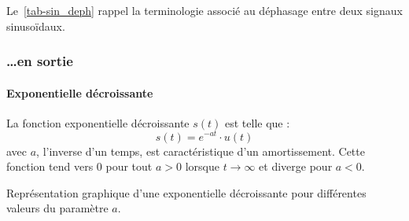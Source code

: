 Le~\cref{tab-sin_deph} rappel la terminologie associé au déphasage entre 
deux signaux sinuso\"idaux. 
\subsubsection{\ldots en sortie}
\paragraph{Exponentielle décroissante}
La fonction exponentielle décroissante $s(t)$ est telle que :
\[
    s(t)=e^{-at}\cdot u(t)
\]
avec $a$, l'inverse d'un temps, est caractéristique d'un amortissement.
Cette fonction tend vers 0 pour tout $a>0$ lorsque $t\rightarrow\infty$ et 
diverge pour $a<0$.
\begin{marginfigure}
    \captionsetup{width=0.95\linewidth,belowskip=0pt} 
    \centering
    \resizebox{\linewidth}{!}{}
    \caption{Représentation graphique d'une exponentielle décroissante pour 
             différentes valeurs du paramètre $a$.\label{fig-exp}}
\end{marginfigure}
